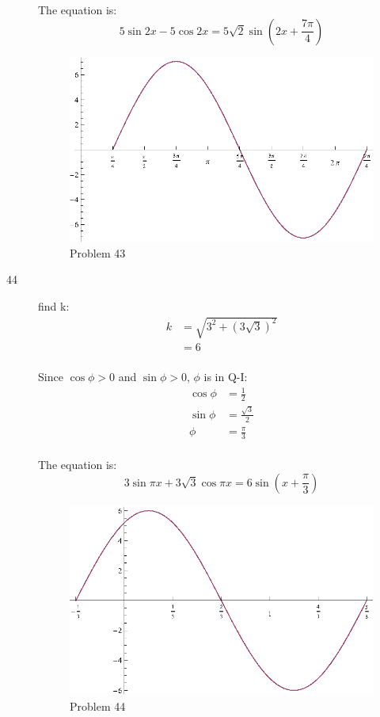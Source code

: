 \documentclass{exam}
\begin{document}
\begin{description}
        The equation is:
        \[
          5 \sin 2x - 5 \cos 2x = \boxed{ 5 \sqrt{2} \sin \left( 2x + \frac{7 \pi}{4} \right) } 
        \]

        \begin{figure}[H]
          \centering
          \includegraphics[scale=0.8]{problem43.eps}
          \caption{Problem 43}
        \end{figure}

      \item[44] 
        find k:
        \begin{align*}
          k & = \sqrt{3^2 + (3 \sqrt{3})^2} \\
            & = 6 \\
        \end{align*}

        Since $\cos \phi > 0$ and $\sin \phi > 0$, $\phi$ is in Q-I:
        \begin{align*}
          \cos \phi & = \frac{1}{2} \\
          \sin \phi & = \frac{\sqrt{3}}{2} \\
          \phi      & = \frac{\pi}{3} \\
        \end{align*}

        The equation is:
        \[
          3 \sin \pi x + 3 \sqrt{3} \cos \pi x = \boxed{6 \sin \left( x + \frac{\pi}{3} \right)} 
        \]

        \begin{figure}[H]
          \centering
          \includegraphics[scale=0.8]{problem44.eps}
          \caption{Problem 44}
        \end{figure}


\end{description}
\end{document}

